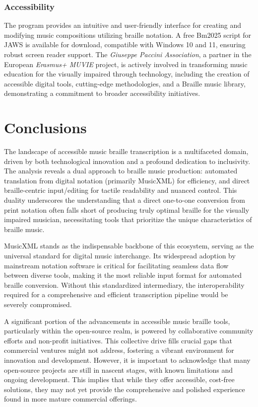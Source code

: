 \subsubsection{Accessibility}
The program provides an intuitive and user-friendly interface for creating and modifying music compositions utilizing braille notation. \cite{braillemusiceditor} A free Bm2025 script for JAWS is available for download, compatible with Windows 10 and 11, ensuring robust screen reader support. \cite{braillemusiceditor} The \textit{Giuseppe Paccini Association}, a partner in the European \textit{Erasmus+ MUVIE} project, is actively involved in transforming music education for the visually impaired through technology, including the creation of accessible digital tools, cutting-edge methodologies, and a Braille music library, demonstrating a commitment to broader accessibility initiatives. \cite{braillemusiceditor}

\section{Conclusions}

The landscape of accessible music braille transcription is a multifaceted domain, driven by both technological innovation and a profound dedication to inclusivity. The analysis reveals a dual approach to braille music production: automated translation from digital notation (primarily MusicXML) for efficiency, and direct braille-centric input/editing for tactile readability and nuanced control. This duality underscores the understanding that a direct one-to-one conversion from print notation often falls short of producing truly optimal braille for the visually impaired musician, necessitating tools that prioritize the unique characteristics of braille music.

MusicXML stands as the indispensable backbone of this ecosystem, serving as the universal standard for digital music interchange. Its widespread adoption by mainstream notation software is critical for facilitating seamless data flow between diverse tools, making it the most reliable input format for automated braille conversion. Without this standardized intermediary, the interoperability required for a comprehensive and efficient transcription pipeline would be severely compromised.

A significant portion of the advancements in accessible music braille tools, particularly within the open-source realm, is powered by collaborative community efforts and non-profit initiatives. This collective drive fills crucial gaps that commercial ventures might not address, fostering a vibrant environment for innovation and development. However, it is important to acknowledge that many open-source projects are still in nascent stages, with known limitations and ongoing development. This implies that while they offer accessible, cost-free solutions, they may not yet provide the comprehensive and polished experience found in more mature commercial offerings.

